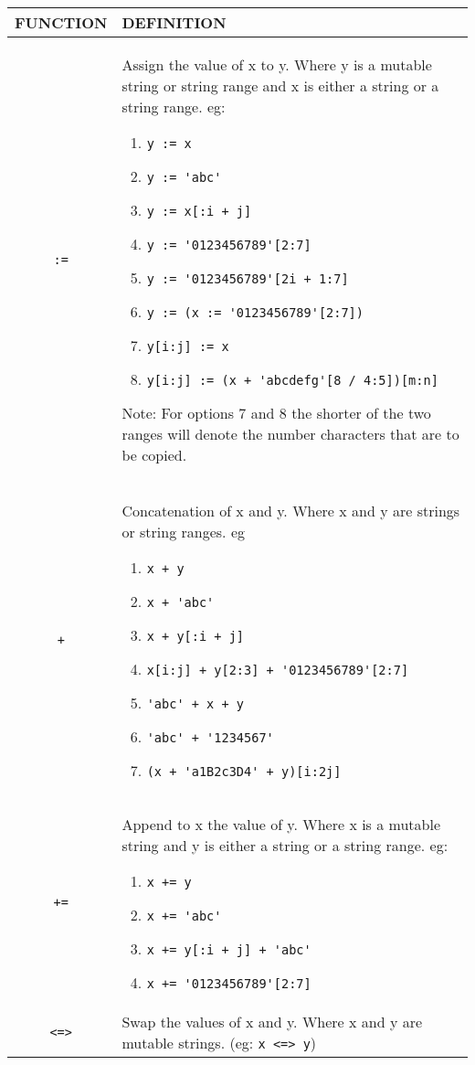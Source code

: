 \begin{tabular}{|c|p{}|}
\hline
FUNCTION& DEFINITION\\
\hline
\verb':='& Assign the value of x to y. Where y is a mutable string  or
 string range and x is either a string or a string  range. eg:
 \begin{enumerate}
\item\verb'y := x'
\item\verb"y := 'abc'"
\item\verb'y := x[:i + j]'
\item\verb"y := '0123456789'[2:7]"
\item\verb"y := '0123456789'[2i + 1:7]"
\item\verb"y := (x := '0123456789'[2:7])"
\item\verb"y[i:j] := x"
\item\verb"y[i:j] := (x + 'abcdefg'[8 / 4:5])[m:n]"
\end{enumerate}

Note: For options 7 and 8 the shorter of the two ranges 
will denote the number characters that are to be copied.\\
\verb'+'&  Concatenation of x and y. Where x and y are strings or  
 string ranges. eg
 \begin{enumerate}
\item\verb"x + y"
\item\verb"x + 'abc'"
\item\verb"x + y[:i + j]"
\item\verb"x[i:j] + y[2:3] + '0123456789'[2:7]"
\item\verb"'abc' + x + y"
\item\verb"'abc' + '1234567'"
\item\verb"(x + 'a1B2c3D4' + y)[i:2j]"
\end{enumerate}\\
\verb'+='& Append to x the value of y. Where x is a mutable string 
and y is either a string or a string range. eg:
\begin{enumerate}
\item\verb"x += y"                  
\item\verb"x += 'abc'"              
\item\verb"x += y[:i + j] + 'abc'"
\item\verb"x += '0123456789'[2:7]"
\end{enumerate}
\\
\verb'<=>'&  Swap the values of x and y. Where x and y are mutable   
            strings.  (eg: \verb'x <=> y')\\
  \hline
\end{tabular}

